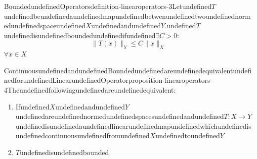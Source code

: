 \begin{mystthmdefinition}{BoundedundefinedOperators}{definition-linearoperators-3}Letundefined$T$undefinedbeundefinedaundefinedmapundefinedbetwenundefinedtwoundefinednormedundefinedspaceundefined$X$undefinedandundefined$Y$.undefined$T$undefinedisundefinedboundedundefinedifundefined$\exists C>0$:
\begin{equation}
\|T(x)\|_Y\leq C\|x\|_X
\end{equation}
$\forall x \in X$

\end{mystthmdefinition}
\begin{mystthmproposition}{ContinuousundefinedandundefinedBoundedundefinedareundefinedequivalentundefinedforundefinedLinearundefinedOperator}{proposition-linearoperators-4}Theundefinedfollowingundefinedareundefinedequivalent:

\begin{enumerate}
\item Ifundefined$X$undefinedandundefined$Y$undefinedareundefinednormedundefinedspacesundefinedandundefined$T:X\to Y$undefinedisundefinedaundefinedlinearundefinedmapundefinedwhichundefinedisundefinedcontinuousundefinedfromundefined$X$undefinedtoundefined$Y$
\item $T$undefinedisundefinedbounded
\end{enumerate}

\end{mystthmproposition}
